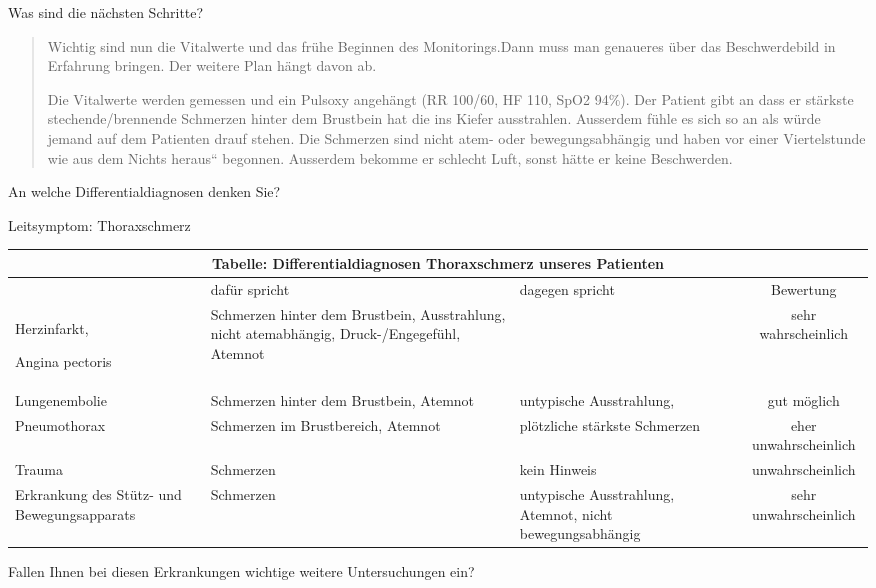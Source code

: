 Was sind die n\"achsten Schritte?
\begin{quote}
Wichtig sind nun die Vitalwerte und das fr\"uhe Beginnen des
Monitorings.Dann muss man genaueres \"uber das Beschwerdebild in
Erfahrung bringen. Der weitere Plan h\"angt davon ab.

Die Vitalwerte werden gemessen und ein Pulsoxy angeh\"angt (RR 100/60,
HF 110, SpO2 94\%). Der Patient gibt an dass er st\"arkste
stechende/brennende Schmerzen hinter dem Brustbein hat die ins Kiefer
ausstrahlen. Ausserdem f\"uhle es sich so an als w\"urde jemand auf dem
Patienten drauf stehen. Die Schmerzen sind nicht atem- oder
bewegungsabh\"angig  und haben vor einer Viertelstunde
{\quotedblbase}wie aus dem Nichts heraus{\textquotedblleft} begonnen.
Ausserdem bekomme er schlecht Luft, sonst h\"atte er keine Beschwerden.
\end{quote}

An welche Differentialdiagnosen denken Sie?

Leitsymptom: Thoraxschmerz 

\begin{tabularx}{\linewidth}[H]{XXXc}
\toprule
\multicolumn{4}{c}{\centering Tabelle: Differentialdiagnosen
Thoraxschmerz unseres Patienten
}\\\midrule
 &
\centering daf\"ur spricht
 &
\centering dagegen spricht
 &
Bewertung
\\\midrule
Herzinfarkt, 

Angina pectoris
 &
Schmerzen hinter dem Brustbein, Ausstrahlung, nicht atemabh\"angig,
Druck-/Engegef\"uhl, Atemnot
 &
 &
sehr wahrscheinlich
\\\midrule
Lungenembolie
 &
Schmerzen hinter dem Brustbein, Atemnot
 &
untypische Ausstrahlung, 
 &
gut m\"oglich
\\\midrule
Pneumothorax
 &
Schmerzen im Brustbereich, Atemnot
 &
pl\"otzliche st\"arkste Schmerzen
 &
eher unwahrscheinlich
\\\midrule
Trauma
 &
Schmerzen
 &
kein Hinweis
 &
unwahrscheinlich
\\\midrule
Erkrankung des St\"utz- und Bewegungsapparats
 &
Schmerzen 
 &
untypische Ausstrahlung, Atemnot, nicht bewegungsabh\"angig
 &
sehr unwahrscheinlich
\\\bottomrule
\end{tabularx}


Fallen Ihnen bei diesen Erkrankungen wichtige weitere Untersuchungen
ein?

